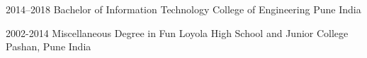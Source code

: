     \cventry
        {2014--2018}
        {Bachelor of Information Technology}
        {College of Engineering}
        {Pune}
        {India}
        {
        }

    \cventry
        {2002-2014}
        {Miscellaneous Degree in Fun}
        {Loyola High School and Junior College}
        {Pashan, Pune}
        {India}
        {
        }

